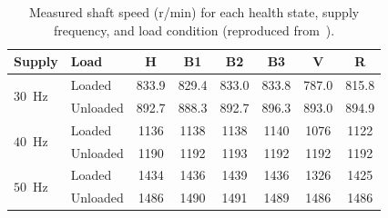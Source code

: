 \begin{table}[t]
\centering
\caption{Measured shaft speed (r/min) for each health state, supply frequency,
and load condition (reproduced from~\cite{ertargin2026smartphone}).}
\label{tab:speeds}
\renewcommand{\arraystretch}{1.15}
\setlength{\tabcolsep}{4pt}
\begin{tabular}{@{}llcccccc@{}}
\toprule
\textbf{Supply} & \textbf{Load} & \textbf{H} & \textbf{B1} & \textbf{B2} &
\textbf{B3} & \textbf{V} & \textbf{R} \\
\midrule
\multirow{2}{*}{$30$~Hz} & Loaded   & 833.9 & 829.4 & 833.0 & 833.8 & 787.0 & 815.8 \\
                         & Unloaded & 892.7 & 888.3 & 892.7 & 896.3 & 893.0 & 894.9 \\
\multirow{2}{*}{$40$~Hz} & Loaded   & 1136 & 1138 & 1138 & 1140 & 1076 & 1122 \\
                         & Unloaded & 1190 & 1192 & 1193 & 1192 & 1192 & 1192 \\
\multirow{2}{*}{$50$~Hz} & Loaded   & 1434 & 1436 & 1439 & 1436 & 1326 & 1425 \\
                         & Unloaded & 1486 & 1490 & 1491 & 1489 & 1486 & 1486 \\
\bottomrule
\end{tabular}
\end{table}

